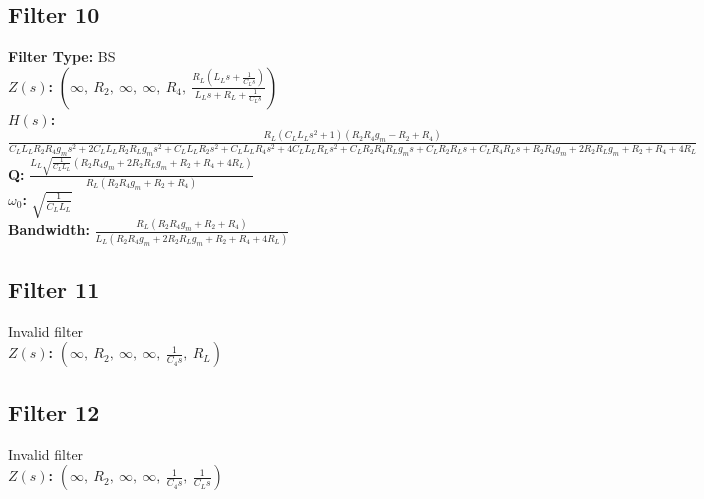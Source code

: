 \documentclass{article}
\begin{document}
\subsection*{Filter 10}
\textbf{Filter Type:} BS \\ 
\textbf{$Z(s)$:} $\left( \infty, \  R_{2}, \  \infty, \  \infty, \  R_{4}, \  \frac{R_{L} \left(L_{L} s + \frac{1}{C_{L} s}\right)}{L_{L} s + R_{L} + \frac{1}{C_{L} s}}\right)$ \\ 
\textbf{$H(s)$:} $\frac{R_{L} \left(C_{L} L_{L} s^{2} + 1\right) \left(R_{2} R_{4} g_{m} - R_{2} + R_{4}\right)}{C_{L} L_{L} R_{2} R_{4} g_{m} s^{2} + 2 C_{L} L_{L} R_{2} R_{L} g_{m} s^{2} + C_{L} L_{L} R_{2} s^{2} + C_{L} L_{L} R_{4} s^{2} + 4 C_{L} L_{L} R_{L} s^{2} + C_{L} R_{2} R_{4} R_{L} g_{m} s + C_{L} R_{2} R_{L} s + C_{L} R_{4} R_{L} s + R_{2} R_{4} g_{m} + 2 R_{2} R_{L} g_{m} + R_{2} + R_{4} + 4 R_{L}}$ \\ 
\textbf{Q:} $\frac{L_{L} \sqrt{\frac{1}{C_{L} L_{L}}} \left(R_{2} R_{4} g_{m} + 2 R_{2} R_{L} g_{m} + R_{2} + R_{4} + 4 R_{L}\right)}{R_{L} \left(R_{2} R_{4} g_{m} + R_{2} + R_{4}\right)}$ \\ 
\textbf{$\omega_0$:} $\sqrt{\frac{1}{C_{L} L_{L}}}$ \\ 
\textbf{Bandwidth:} $\frac{R_{L} \left(R_{2} R_{4} g_{m} + R_{2} + R_{4}\right)}{L_{L} \left(R_{2} R_{4} g_{m} + 2 R_{2} R_{L} g_{m} + R_{2} + R_{4} + 4 R_{L}\right)}$ \\ 
\subsection*{Filter 11}
Invalid filter \\ 
\textbf{$Z(s)$:} $\left( \infty, \  R_{2}, \  \infty, \  \infty, \  \frac{1}{C_{4} s}, \  R_{L}\right)$ \\ 
\subsection*{Filter 12}
Invalid filter \\ 
\textbf{$Z(s)$:} $\left( \infty, \  R_{2}, \  \infty, \  \infty, \  \frac{1}{C_{4} s}, \  \frac{1}{C_{L} s}\right)$ \\ 
\end{document}
